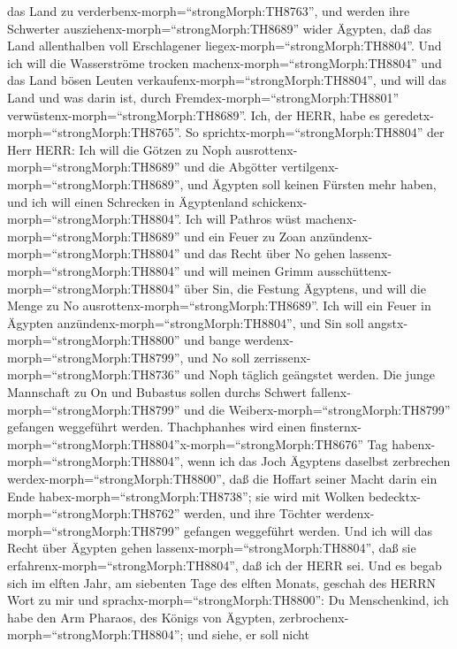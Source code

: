 das Land zu verderbenx-morph=``strongMorph:TH8763'', und werden ihre
Schwerter ausziehenx-morph=``strongMorph:TH8689'' wider Ägypten, daß das
Land allenthalben voll Erschlagener liegex-morph=``strongMorph:TH8804''.
 Und ich will die Wasserströme trocken
machenx-morph=``strongMorph:TH8804'' und das Land bösen Leuten
verkaufenx-morph=``strongMorph:TH8804'', und will das Land und was darin
ist, durch Fremdex-morph=``strongMorph:TH8801''
verwüstenx-morph=``strongMorph:TH8689''. Ich, der HERR, habe es
geredetx-morph=``strongMorph:TH8765''.  So
sprichtx-morph=``strongMorph:TH8804'' der Herr HERR: Ich will die Götzen
zu Noph ausrottenx-morph=``strongMorph:TH8689'' und die Abgötter
vertilgenx-morph=``strongMorph:TH8689'', und Ägypten soll keinen Fürsten
mehr haben, und ich will einen Schrecken in Ägyptenland
schickenx-morph=``strongMorph:TH8804''.  Ich will Pathros
wüst machenx-morph=``strongMorph:TH8689'' und ein Feuer zu Zoan
anzündenx-morph=``strongMorph:TH8804'' und das Recht über No gehen
lassenx-morph=``strongMorph:TH8804''  und will meinen Grimm
ausschüttenx-morph=``strongMorph:TH8804'' über Sin, die Festung
Ägyptens, und will die Menge zu No
ausrottenx-morph=``strongMorph:TH8689''.  Ich will ein
Feuer in Ägypten anzündenx-morph=``strongMorph:TH8804'', und Sin soll
angstx-morph=``strongMorph:TH8800'' und bange
werdenx-morph=``strongMorph:TH8799'', und No soll
zerrissenx-morph=``strongMorph:TH8736'' und Noph täglich geängstet
werden.  Die junge Mannschaft zu On und Bubastus sollen
durchs Schwert fallenx-morph=``strongMorph:TH8799'' und die
Weiberx-morph=``strongMorph:TH8799'' gefangen weggeführt werden.
 Thachphanhes wird einen
finsternx-morph=``strongMorph:TH8804''\textbar x-morph=``strongMorph:TH8676''
Tag habenx-morph=``strongMorph:TH8804'', wenn ich das Joch Ägyptens
daselbst zerbrechen werdex-morph=``strongMorph:TH8800'', daß die Hoffart
seiner Macht darin ein Ende habex-morph=``strongMorph:TH8738''; sie wird
mit Wolken bedecktx-morph=``strongMorph:TH8762'' werden, und ihre
Töchter werdenx-morph=``strongMorph:TH8799'' gefangen weggeführt werden.
 Und ich will das Recht über Ägypten gehen
lassenx-morph=``strongMorph:TH8804'', daß sie
erfahrenx-morph=``strongMorph:TH8804'', daß ich der HERR sei.
 Und es begab sich im elften Jahr, am siebenten Tage des
elften Monats, geschah des HERRN Wort zu mir und
sprachx-morph=``strongMorph:TH8800'':  Du Menschenkind, ich
habe den Arm Pharaos, des Königs von Ägypten,
zerbrochenx-morph=``strongMorph:TH8804''; und siehe, er soll nicht
